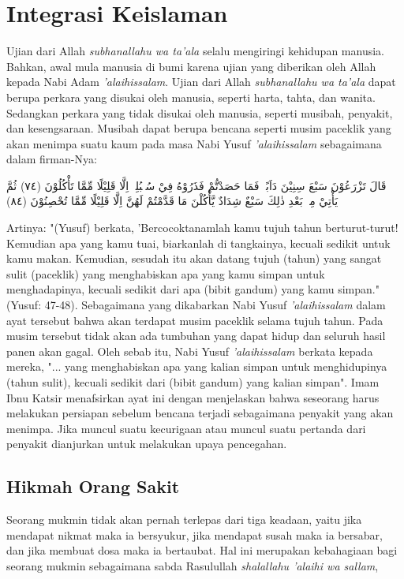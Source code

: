 \section{Integrasi Keislaman}
Ujian dari Allah \textit{subhanallahu wa ta'ala} selalu mengiringi kehidupan manusia. Bahkan, awal mula manusia di bumi karena ujian yang diberikan oleh Allah kepada Nabi Adam \textit{'alaihissalam}. Ujian dari Allah \textit{subhanallahu wa ta'ala} dapat berupa perkara yang disukai oleh manusia, seperti harta, tahta, dan wanita. Sedangkan perkara yang tidak disukai oleh manusia, seperti musibah, penyakit, dan kesengsaraan. Musibah dapat berupa bencana seperti musim paceklik yang akan menimpa suatu kaum pada masa Nabi Yusuf \textit{'alaihissalam} sebagaimana dalam firman-Nya:

\begin{flushright}
    \begin{RLtext}
        قَالَ تَزْرَعُوْنَ سَبْعَ سِنِيْنَ دَاَبًاۚ فَمَا حَصَدْتُّمْ فَذَرُوْهُ فِيْ سُنْۢبُلِهٖٓ اِلَّا قَلِيْلًا مِّمَّا تَأْكُلُوْنَ (٧٤) ثُمَّ يَأْتِيْ مِنْۢ بَعْدِ ذٰلِكَ سَبْعٌ شِدَادٌ يَّأْكُلْنَ مَا قَدَّمْتُمْ لَهُنَّ اِلَّا قَلِيْلًا مِّمَّا تُحْصِنُوْنَ (٨٤)
    \end{RLtext}
\end{flushright}

Artinya: "(Yusuf) berkata, 'Bercocoktanamlah kamu tujuh tahun berturut-turut! Kemudian apa yang kamu tuai, biarkanlah di tangkainya, kecuali sedikit untuk kamu makan. Kemudian, sesudah itu akan datang tujuh (tahun) yang sangat sulit (paceklik) yang menghabiskan apa yang kamu simpan untuk menghadapinya, kecuali sedikit dari apa (bibit gandum) yang kamu simpan." (Yusuf: 47-48). Sebagaimana yang dikabarkan Nabi Yusuf \textit{'alaihissalam} dalam ayat tersebut bahwa akan terdapat musim paceklik selama tujuh tahun. Pada musim tersebut tidak akan ada tumbuhan yang dapat hidup dan seluruh hasil panen akan gagal. Oleh sebab itu, Nabi Yusuf \textit{'alaihissalam} berkata kepada mereka, "... yang menghabiskan apa yang kalian simpan untuk menghidupinya (tahun sulit), kecuali sedikit dari (bibit gandum) yang kalian simpan". Imam Ibnu Katsir menafsirkan ayat ini dengan menjelaskan bahwa seseorang harus melakukan persiapan sebelum bencana terjadi sebagaimana penyakit yang akan menimpa. Jika muncul suatu kecurigaan atau muncul suatu pertanda dari penyakit dianjurkan untuk melakukan upaya pencegahan.

    \subsection{Hikmah Orang Sakit}
    Seorang mukmin tidak akan pernah terlepas dari tiga keadaan, yaitu jika mendapat nikmat maka ia bersyukur, jika mendapat susah maka ia bersabar, dan jika membuat dosa maka ia bertaubat. Hal ini merupakan kebahagiaan bagi seorang mukmin sebagaimana sabda Rasulullah \textit{shalallahu 'alaihi wa sallam}, 
    
